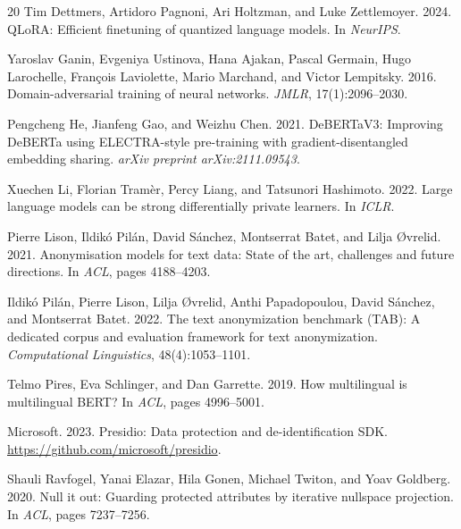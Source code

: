 \documentclass[11pt,a4paper]{article}
\begin{document}
\begin{thebibliography}{20}
Tim Dettmers, Artidoro Pagnoni, Ari Holtzman, and Luke Zettlemoyer. 2024.
\newblock QLoRA: Efficient finetuning of quantized language models.
\newblock In \emph{NeurIPS}.

Yaroslav Ganin, Evgeniya Ustinova, Hana Ajakan, Pascal Germain,
Hugo Larochelle, Fran\c{c}ois Laviolette, Mario Marchand, and Victor Lempitsky.
2016.
\newblock Domain-adversarial training of neural networks.
\newblock \emph{JMLR}, 17(1):2096--2030.

Pengcheng He, Jianfeng Gao, and Weizhu Chen. 2021.
\newblock DeBERTaV3: Improving DeBERTa using ELECTRA-style pre-training with
  gradient-disentangled embedding sharing.
\newblock \emph{arXiv preprint arXiv:2111.09543}.

Xuechen Li, Florian Tram\`{e}r, Percy Liang, and Tatsunori Hashimoto. 2022.
\newblock Large language models can be strong differentially private learners.
\newblock In \emph{ICLR}.

Pierre Lison, Ildik\'{o} Pil\'{a}n, David S\'{a}nchez, Montserrat Batet, and
Lilja {\O}vrelid. 2021.
\newblock Anonymisation models for text data: State of the art, challenges and
  future directions.
\newblock In \emph{ACL}, pages 4188--4203.

Ildik\'{o} Pil\'{a}n, Pierre Lison, Lilja {\O}vrelid, Anthi Papadopoulou,
David S\'{a}nchez, and Montserrat Batet. 2022.
\newblock The text anonymization benchmark (TAB): A dedicated corpus and
  evaluation framework for text anonymization.
\newblock \emph{Computational Linguistics}, 48(4):1053--1101.

Telmo Pires, Eva Schlinger, and Dan Garrette. 2019.
\newblock How multilingual is multilingual BERT?
\newblock In \emph{ACL}, pages 4996--5001.

Microsoft. 2023.
\newblock Presidio: Data protection and de-identification SDK.
\newblock \url{https://github.com/microsoft/presidio}.

Shauli Ravfogel, Yanai Elazar, Hila Gonen, Michael Twiton, and Yoav Goldberg.
2020.
\newblock Null it out: Guarding protected attributes by iterative nullspace
  projection.
\newblock In \emph{ACL}, pages 7237--7256.


\end{thebibliography}
\end{document}
